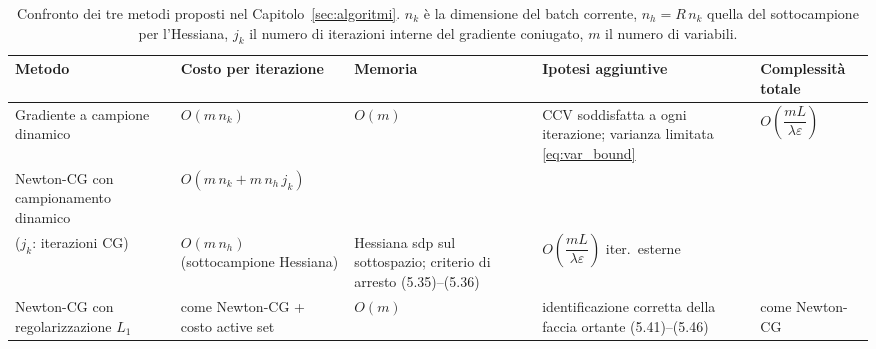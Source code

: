 \begin{table}[h]
\centering
\small
\renewcommand{\arraystretch}{1.35}
\setlength{\tabcolsep}{4pt}
\begin{tabular}{p{2.4cm} p{3.1cm} p{2.6cm} p{2.9cm} p{3.0cm}}
\toprule
\textbf{Metodo} & \textbf{Costo per iterazione} & \textbf{Memoria}
& \textbf{Ipotesi aggiuntive} & \textbf{Complessit\`a totale} \\
\midrule
Gradiente a campione dinamico &
$O(m\,n_k)$ &
$O(m)$ &
CCV soddisfatta a ogni iterazione; varianza limitata \eqref{eq:var_bound} &
$O\!\left(\dfrac{mL}{\lambda\varepsilon}\right)$ \\
Newton-CG con campionamento dinamico &
$O(m\,n_k + m\,n_h\,j_k)$\\($j_k$: iterazioni CG) &
$O(m\,n_h)$ (sottocampione Hessiana) &
Hessiana sdp sul sottospazio; criterio di arresto (5.35)--(5.36) &
$O\!\left(\dfrac{mL}{\lambda\varepsilon}\right)$ iter.\ esterne \\
Newton-CG con regolarizzazione $L_1$ &
come Newton-CG + costo active set &
$O(m)$ &
identificazione corretta della faccia ortante (5.41)--(5.46) &
come Newton-CG \\
\bottomrule
\end{tabular}
\caption{Confronto dei tre metodi proposti nel Capitolo~\ref{sec:algoritmi}.
$n_k$ \`e la dimensione del batch corrente, $n_h = R\,n_k$ quella del
sottocampione per l'Hessiana, $j_k$ il numero di iterazioni interne del
gradiente coniugato, $m$ il numero di variabili.}
\label{tab:5_1}
\end{table}
